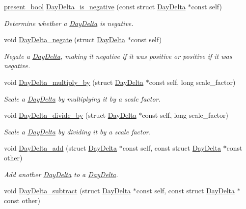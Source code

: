 \begin{DoxyCompactItemize}
\hyperlink{types_8h_a1c24e2cdd988b886e889080ded176ae0}{present\-\_\-bool} \hyperlink{day-delta_8h_ab4347a4d40f2e9577ce86f3fb5fb004d}{Day\-Delta\-\_\-is\-\_\-negative} (const struct \hyperlink{structDayDelta}{Day\-Delta} $\ast$const self)
\begin{DoxyCompactList}\small\item\em Determine whether a \hyperlink{structDayDelta}{Day\-Delta} is negative. \end{DoxyCompactList}\item 
void \hyperlink{day-delta_8h_a9deb74bc8d748a21449a16e658f16432}{Day\-Delta\-\_\-negate} (struct \hyperlink{structDayDelta}{Day\-Delta} $\ast$const self)
\begin{DoxyCompactList}\small\item\em Negate a \hyperlink{structDayDelta}{Day\-Delta}, making it negative if it was positive or positive if it was negative. \end{DoxyCompactList}\item 
void \hyperlink{day-delta_8h_a721dff4c68fcf1dca9f945a8f1f1d1c9}{Day\-Delta\-\_\-multiply\-\_\-by} (struct \hyperlink{structDayDelta}{Day\-Delta} $\ast$const self, long scale\-\_\-factor)
\begin{DoxyCompactList}\small\item\em Scale a \hyperlink{structDayDelta}{Day\-Delta} by multiplying it by a scale factor. \end{DoxyCompactList}\item 
void \hyperlink{day-delta_8h_a124a508f87fb20a4b23db6f0729b63ac}{Day\-Delta\-\_\-divide\-\_\-by} (struct \hyperlink{structDayDelta}{Day\-Delta} $\ast$const self, long scale\-\_\-factor)
\begin{DoxyCompactList}\small\item\em Scale a \hyperlink{structDayDelta}{Day\-Delta} by dividing it by a scale factor. \end{DoxyCompactList}\item 
void \hyperlink{day-delta_8h_a1d879b02971a0c302622e56b577ceb23}{Day\-Delta\-\_\-add} (struct \hyperlink{structDayDelta}{Day\-Delta} $\ast$const self, const struct \hyperlink{structDayDelta}{Day\-Delta} $\ast$const other)
\begin{DoxyCompactList}\small\item\em Add another \hyperlink{structDayDelta}{Day\-Delta} to a \hyperlink{structDayDelta}{Day\-Delta}. \end{DoxyCompactList}\item 
void \hyperlink{day-delta_8h_a6fd32ca3c633ebe279df2a468fd1d91e}{Day\-Delta\-\_\-subtract} (struct \hyperlink{structDayDelta}{Day\-Delta} $\ast$const self, const struct \hyperlink{structDayDelta}{Day\-Delta} $\ast$const other)

\end{DoxyCompactItemize}
